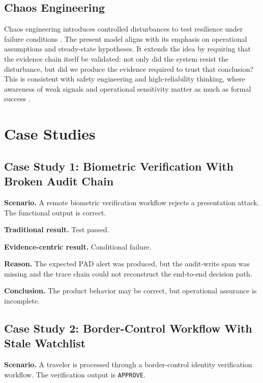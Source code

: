 \documentclass[11pt,a4paper]{article}
\begin{document}
\subsection{Chaos Engineering}

Chaos engineering introduces controlled disturbances to test resilience under failure conditions \cite{basiri}. The present model aligns with its emphasis on operational assumptions and steady-state hypotheses. It extends the idea by requiring that the evidence chain itself be validated: not only did the system resist the disturbance, but did we produce the evidence required to trust that conclusion? This is consistent with safety engineering and high-reliability thinking, where awareness of weak signals and operational sensitivity matter as much as formal success \cite{hollnagel,weick}.

\section{Case Studies}

\subsection{Case Study 1: Biometric Verification With Broken Audit Chain}

\textbf{Scenario.} A remote biometric verification workflow rejects a presentation attack. The functional output is correct.

\textbf{Traditional result.} Test passed.

\textbf{Evidence-centric result.} Conditional failure.

\textbf{Reason.} The expected PAD alert was produced, but the audit-write span was missing and the trace chain could not reconstruct the end-to-end decision path.

\textbf{Conclusion.} The product behavior may be correct, but operational assurance is incomplete.

\subsection{Case Study 2: Border-Control Workflow With Stale Watchlist}

\textbf{Scenario.} A traveler is processed through a border-control identity verification workflow. The verification output is \texttt{APPROVE}.
\end{document}

